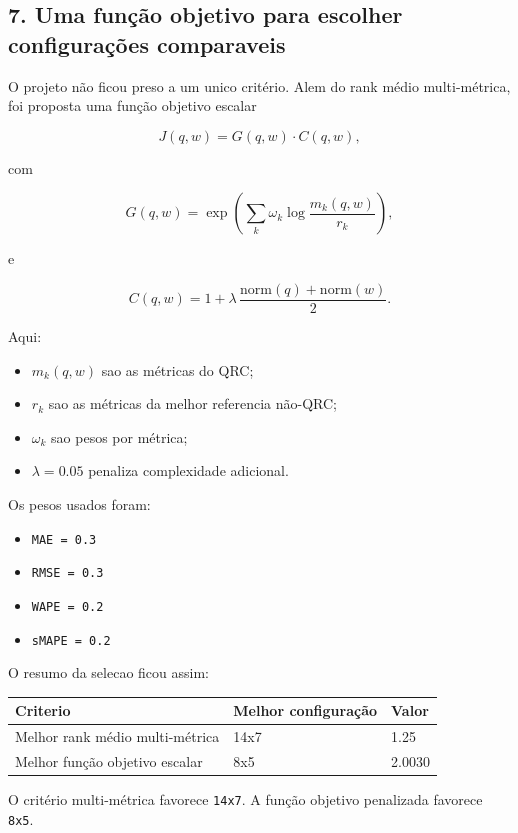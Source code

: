 \documentclass[12pt]{article}
\providecommand{\tightlist}{%
          \setlength{\itemsep}{0pt}\setlength{\parskip}{0pt}}
\begin{document}
\subsection{7. Uma função objetivo para escolher configurações comparaveis}\label{7-uma-funuxe7uxe3o-objetivo-para-escolher-configurauxe7uxf5es-comparaveis}

O projeto não ficou preso a um unico critério. Alem do rank médio multi-métrica, foi proposta uma função objetivo escalar

\[
J(q, w) = G(q, w) \cdot C(q, w),
\]

com

\[
G(q, w) = \exp\left(\sum_k \omega_k \log\frac{m_k(q, w)}{r_k}\right),
\]

e

\[
C(q, w) = 1 + \lambda \, \frac{\mathrm{norm}(q) + \mathrm{norm}(w)}{2}.
\]

Aqui:

\begin{itemize}
\tightlist
\item
  \(m_k(q, w)\) sao as métricas do QRC;
\item
  \(r_k\) sao as métricas da melhor referencia não-QRC;
\item
  \(\omega_k\) sao pesos por métrica;
\item
  \(\lambda = 0.05\) penaliza complexidade adicional.
\end{itemize}

Os pesos usados foram:

\begin{itemize}
\tightlist
\item
  \texttt{MAE\ =\ 0.3}
\item
  \texttt{RMSE\ =\ 0.3}
\item
  \texttt{WAPE\ =\ 0.2}
\item
  \texttt{sMAPE\ =\ 0.2}
\end{itemize}

O resumo da selecao ficou assim:

\begin{longtable}[]{@{}lll@{}}
\toprule\noalign{}
Criterio & Melhor configuração & Valor \\
\midrule\noalign{}
\endhead
\bottomrule\noalign{}
\endlastfoot
Melhor rank médio multi-métrica & 14x7 & 1.25 \\
Melhor função objetivo escalar & 8x5 & 2.0030 \\
\end{longtable}

O critério multi-métrica favorece \texttt{14x7}. A função objetivo penalizada favorece \texttt{8x5}.
\end{document}
